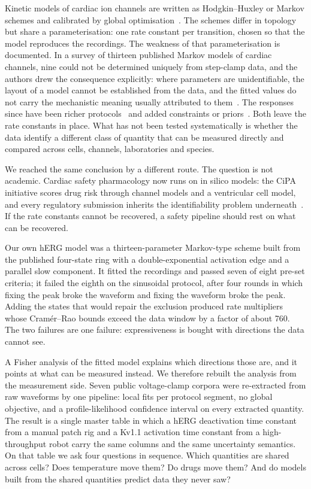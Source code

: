 \documentclass[11pt,a4paper]{article}
\begin{document}
Kinetic models of cardiac ion channels are written as Hodgkin--Huxley or Markov
schemes and calibrated by global
optimisation~\cite{Colatsky2016,Li2017,Dutta2017,OHara2011,Clerx2016}.
The schemes differ in topology but share a parameterisation: one rate constant
per transition, chosen so that the model reproduces the recordings. The weakness
of that parameterisation is documented. In a survey of thirteen published Markov
models of cardiac channels, nine could not be determined uniquely from
step-clamp data, and the authors drew the consequence explicitly: where
parameters are unidentifiable, the layout of a model cannot be established from
the data, and the fitted values do not carry the mechanistic meaning usually
attributed to them~\cite{Fink2009}. The responses since have been richer
protocols~\cite{Beattie2018} and added constraints or
priors~\cite{Clerx2019}. Both leave the rate constants in place. What has not
been tested systematically is whether the data identify a different class of
quantity that can be measured directly and compared across cells, channels,
laboratories and species.

We reached the same conclusion by a different route. The question is not
academic. Cardiac safety pharmacology now runs on in silico models: the CiPA
initiative scores drug risk through channel models and a ventricular cell
model, and every regulatory submission inherits the identifiability problem
underneath~\cite{Colatsky2016,Dutta2017}. If the rate constants cannot be
recovered, a safety pipeline should rest on what can be recovered.

Our own hERG model was a
thirteen-parameter Markov-type scheme built from the published four-state ring
with a double-exponential activation edge and a parallel slow component. It
fitted the recordings and passed seven of eight pre-set criteria; it failed the
eighth on the sinusoidal protocol, after four rounds in which fixing the peak
broke the waveform and fixing the waveform broke the peak. Adding the states
that would repair the exclusion produced rate multipliers whose Cram\'er--Rao
bounds exceed the data window by a factor of about 760. The two failures are one
failure: expressiveness is bought with directions the data cannot see.

A Fisher analysis of the fitted model explains which directions those are, and
it points at what can be measured instead. We therefore rebuilt the analysis
from the measurement side. Seven public voltage-clamp corpora were re-extracted
from raw waveforms by one pipeline: local fits per protocol segment, no global
objective, and a profile-likelihood confidence interval on every extracted
quantity. The result is a single master table in which a hERG deactivation time
constant from a manual patch rig and a Kv1.1 activation time constant from a
high-throughput robot carry the same columns and the same uncertainty semantics.
On that table we ask four questions in sequence. Which quantities are shared
across cells? Does temperature move them? Do drugs move them? And do models
built from the shared quantities predict data they never saw?
\end{document}
